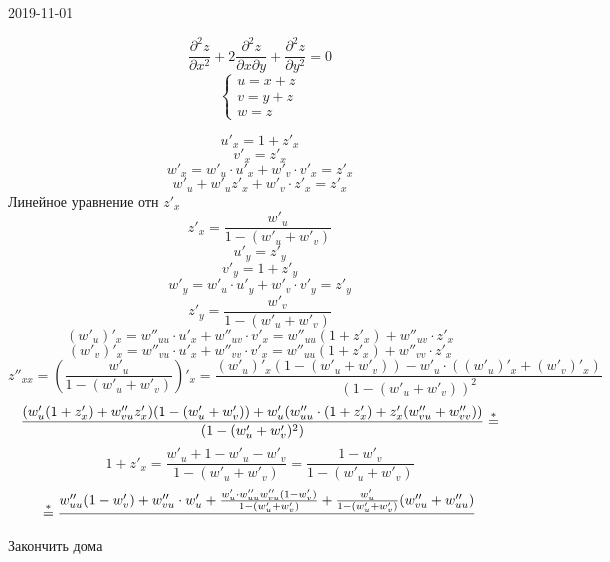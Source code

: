 \documentclass[12pt, fleqn]{article}
\begin{document}
\begin{lect}{2019-11-01}
    \begin{Task} [3507]
        \[\frac{\partial^2 z}{\partial x^2} + 2 \frac{\partial^2 z}{\partial x 
        \partial y} + \frac{\partial^2 z}{\partial y^2} = 0\]
        \[\begin{cases}
            u = x + z\\
            v = y + z\\
            w = z
        \end{cases}\]

        \[u'_x = 1 + z'_x\]
        \[v'_x = z'_x\]
        \[w'_x = w'_u \cdot u'_x + w'_v \cdot v'_x = z'_x\]
        \[w'_u + w'_u z'_x + w'_v \cdot z'_x = z'_x\]
        Линейное уравнение отн $z'_x$
        \[z'_x = \frac{w'_u}{1 - (w'_u + w'_v)}\]
        \[u'_y = z'_y\]
        \[v'_y = 1 + z'_y\]
        \[w'_y = w'_u \cdot u'_y + w'_v \cdot v'_y = z'_y\]
        \[z'_y = \frac{w'_v}{1 - (w'_u + w'_v)}\]
        \[(w'_u)'_x = w''_{uu} \cdot u'_x + w''_{uv} \cdot v'_x = 
        w''_{uu}(1 + z'_x) + w''_{uv} \cdot z'_x   \]
        \[(w'_v)'_x = w''_{vu} \cdot u'_x + w''_{vv} \cdot v'_x = 
        w''_{uu} (1 + z'_x) + w''_{vv} \cdot z'_x  \]
        \[z''_{xx} = \left(\frac{w'_u}{1 - (w'_u + w'_v)}\right)'_x = 
         \frac{(w'_u)'_x(1 -(w'_u + w'_v)) - w'_u \cdot( (w'_u)'_x + (w'_v)'_x)}{(1 -   
        (w'_u + w'_v))^2}\]
        \[\frac{(w'_u(1 + z'_x) + w''_{vu} z'_x)(1 - (w'_u + w'_v)) + w'_u(
        w''_{uu} \cdot (1 + z'_x) + z'_x (w''_{vu} + w''_{vv}  )) }{
        (1 - (w'_u + w'_v)^2)} \overset{*}{=}\]
        \[1 + z'_x = \frac{w'_u + 1 - w'_u - w'_v}{1 - (w'_u + w'_v)} = 
        \frac{1 - w'_v}{1 - (w'_u + w'_v)}\]
        \[\overset{*}{=} \frac{w''_{uu}(1 - w'_v) + w''_{vu} \cdot w'_u + \frac{w'_u \cdot 
                w''_{uu} w''_{vu} (1 - w'_v)  }
        {1 - (w'_u + w'_v)} + \frac{w'_u}{1 - (w'_u + w'_v)}(w''_{vu}  +w''_{uu}  )}{}\]
        Закончить дома
    \end{Task}


\end{lect}
\end{document}

